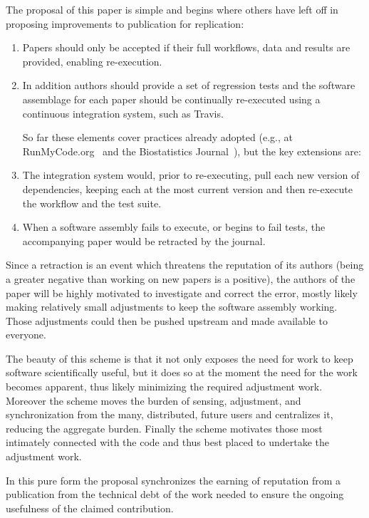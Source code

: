 \documentclass{sigchi}
\begin{document}
The proposal of this paper is simple and begins where others have left off in proposing improvements to publication for replication:

\begin{enumerate}
\item Papers should only be accepted if their full workflows, data and results are provided, enabling re-execution.

\item In addition authors should provide a set of regression tests and the software assemblage for each paper should be continually re-executed using a continuous integration system, such as Travis.

So far these elements cover practices already adopted (e.g., at RunMyCode.org~\cite{stodden_2012} and the Biostatistics Journal~\cite{peng_reproducible_2009}), but the key extensions are:

\item The integration system would, prior to re-executing, pull each new version of dependencies, keeping each at the most current version and then re-execute the workflow and the test suite.

\item When a software assembly fails to execute, or begins to fail tests, the accompanying paper would be retracted by the journal.
\end{enumerate}

Since a retraction is an event which threatens the reputation of its authors (being a greater negative than working on new papers is a positive), the authors of the paper will be highly motivated to investigate and correct the error, mostly likely making relatively small adjustments to keep the software assembly working. Those adjustments could then be pushed upstream and made available to everyone.

The beauty of this scheme is that it not only exposes the need for work to keep software scientifically useful, but it does so at the moment the need for the work becomes apparent, thus likely minimizing the required adjustment work.  Moreover the scheme moves the burden of sensing, adjustment, and synchronization from the many, distributed, future users and centralizes it, reducing the aggregate burden. Finally the scheme motivates those most intimately connected with the code and thus best placed to undertake the adjustment work.

In this pure form the proposal synchronizes the earning of reputation from a publication from the technical debt of the work needed to ensure the ongoing usefulness of the claimed contribution.
\end{document}

